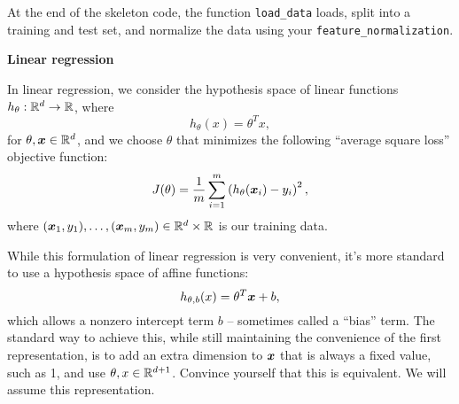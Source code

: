 \documentclass{article}
\newcommand{\nyuparagrah}[1]{\textcolor{nyupurple}{\large #1}}
\begin{document}
At the end of the skeleton code, the function \texttt{load\_data} loads, split into a training and test set, and normalize the data using your \texttt{feature\_normalization}.

\nyuparagrah{\bf Linear regression}

In linear regression, we consider the hypothesis space of linear functions
$h_{\theta}:\mathbb{R}^{d}\to\mathbb{R}$, where
\[
h_{\theta}(x)=\theta^{T}x,
\]
for $\theta,\boldsymbol{x}\in\mathbb{R}^{d}$, and we choose $\theta$ that minimizes
the following ``average square loss'' objective function: 
\[
J(\theta)=\frac{1}{m}\sum_{i=1}^{m}\left(h_{\theta}(\boldsymbol{x}_{i})-y_{i}\right)^{2},
\]
where $(\boldsymbol{x}_{1},y_{1}),\ldots,(\boldsymbol{x}_{m},y_{m})\in\mathbb{R}^{d}\times\mathbb{R}$
is our training data.

While this formulation of linear regression is very convenient, it's
more standard to use a hypothesis space of affine functions:
\[
h_{\theta,b}(x)=\theta^{T} \boldsymbol{x}+b,
\]
which allows a nonzero intercept term $b$ -- sometimes called a ``bias'' term. The standard
way to achieve this, while still maintaining the convenience of the
first representation, is to add an extra dimension to $\boldsymbol{x}$ that is
always a fixed value, such as 1, and use $\theta,x\in\mathbb{R}^{d+1}$. Convince yourself that
this is equivalent. 
We will assume this representation. 
\end{document}
